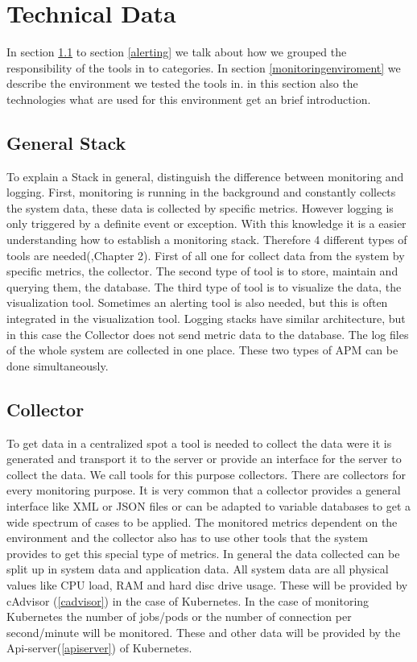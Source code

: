  
\chapter{Technical Data}
\label{chap:ch2}
In section \ref{generalstack} to section \ref{alerting} we talk about how we grouped the responsibility of the tools in to categories. In section \ref{monitoringenviroment} we describe the environment we tested the tools in. in this section also the technologies what are used for this environment get an brief introduction.

\section{General Stack}
\label{generalstack}
To explain a Stack in general, distinguish the difference between monitoring and logging. First, monitoring is running in the background and constantly collects the system data, these data is collected by specific metrics. However logging is only triggered by a definite event or exception.
With this knowledge it is a easier understanding how to establish a monitoring stack. Therefore 4 different types of tools are needed(\cite{cau37427},Chapter 2).
First of all one for collect data from the system by specific metrics, the collector. The second type of tool is to store, maintain and querying them, the database. The third type of tool is to visualize the data, the visualization tool. Sometimes an alerting tool is also needed, but this is often integrated in the visualization tool.
Logging stacks have similar architecture, but in this case the Collector does not send metric data to the database. The log files of the whole system are collected in one place. These two types of APM can be done simultaneously.

\section{Collector}
To get data in a centralized spot a tool is needed to collect the data were it is generated and transport it to the server or provide an interface for the server to collect the data.
We call tools for this purpose collectors. There are collectors for every monitoring purpose. It is very common that a collector provides a general interface like XML or JSON files or can be adapted to variable databases to get a wide spectrum of cases to be applied.
 The monitored metrics dependent on the environment and the collector also has to use other tools that the system provides  to get this special type of metrics. In general the data collected can be split up in system data and application data. All system data are all physical values like CPU load, RAM and hard disc drive usage. These will be provided by cAdvisor (\ref{cadvisor}) in the case of Kubernetes. In the case of monitoring Kubernetes the number of jobs/pods or the number of connection per second/minute will be monitored. These and other data will be provided by the Api-server(\ref{apiserver}) of Kubernetes.
